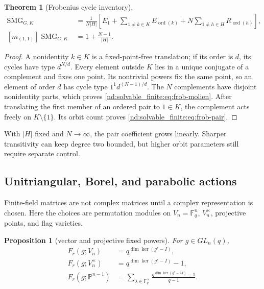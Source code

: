 \documentclass[10pt]{article}
\newcommand{\SMG}{\operatorname{SMG}}
\newcommand{\MGF}{\SMG}
\newcommand{\F}{\mathbb F}
\newtheorem{theorem}{Theorem}
\newtheorem{proposition}{Proposition}
\begin{document}
\begin{theorem}[Frobenius cycle inventory]\label{nd:solvable_finite:thm:frobenius}
\begin{align}
 \MGF_{G,K}
 &=\boxed{\frac1{N|H|}\left[E_1+
 \sum_{1\ne k\in K}E_{\operatorname{ord}(k)}+
 N\sum_{1\ne h\in H}R_{\operatorname{ord}(h)}\right]},\label{nd:solvable_finite:eq:frob-molien}\\
 [m_{(1,1)}]\MGF_{G,K}
 &=\boxed{1+\frac{N-1}{|H|}}.\label{nd:solvable_finite:eq:frob-pair}
\end{align}
\end{theorem}

\begin{proof}
A nonidentity $k\in K$ is a fixed-point-free translation; if its order is
$d$, its cycles have type $d^{N/d}$.  Every element outside $K$ lies in a
unique conjugate of a complement and fixes one point.  Its nontrivial powers
fix the same point, so an element of order $d$ has cycle type
$1^1d^{(N-1)/d}$.  The $N$ complements have disjoint nonidentity parts,
which proves \eqref{nd:solvable_finite:eq:frob-molien}.  After translating the first member of
an ordered pair to $1\in K$, the complement acts freely on $K\setminus\{1\}$.
Its orbit count proves \eqref{nd:solvable_finite:eq:frob-pair}.
\end{proof}

With $|H|$ fixed and $N\to\infty$, the pair coefficient grows linearly.
Sharper transitivity can keep degree two bounded, but higher orbit parameters
still require separate control.

\subsection{Unitriangular, Borel, and parabolic actions}

Finite-field matrices are not complex matrices until a complex
representation is chosen.  Here the choices are permutation modules on
$V_n=\F_q^n$, $V_n^\times$, projective points, and flag varieties.

\begin{proposition}[vector and projective fixed powers]\label{nd:solvable_finite:prop:linear-fixed}
For $g\in GL_n(q)$,
\begin{align}
 F_r(g;V_n)&=q^{\dim\ker(g^r-I)},\label{nd:solvable_finite:eq:vector-fixed}\\
 F_r(g;V_n^\times)&=q^{\dim\ker(g^r-I)}-1,\label{nd:solvable_finite:eq:nonzero-fixed}\\
 F_r(g;\mathbb P^{n-1})
 &=\sum_{\lambda\in\F_q^\times}
 \frac{q^{\dim\ker(g^r-\lambda I)}-1}{q-1}.\label{nd:solvable_finite:eq:projective-fixed}
\end{align}
\end{proposition}
\end{document}
